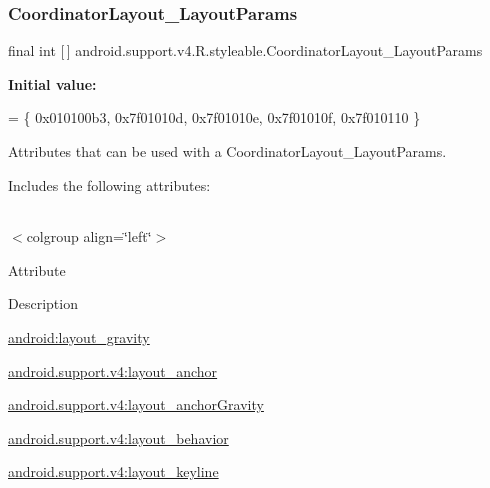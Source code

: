 \subsubsection{\texorpdfstring{Coordinator\+Layout\+\_\+\+Layout\+Params}{CoordinatorLayout\_LayoutParams}}
{\footnotesize\ttfamily final int \mbox{[}$\,$\mbox{]} android.\+support.\+v4.\+R.\+styleable.\+Coordinator\+Layout\+\_\+\+Layout\+Params\hspace{0.3cm}{\ttfamily [static]}}

{\bfseries Initial value\+:}
\begin{DoxyCode}
= \{
            0x010100b3, 0x7f01010d, 0x7f01010e, 0x7f01010f,
            0x7f010110
        \}
\end{DoxyCode}
Attributes that can be used with a Coordinator\+Layout\+\_\+\+Layout\+Params. 

Includes the following attributes\+:

\tabulinesep=1mm
\begin{longtabu} spread 0pt [c]{*{0}{|X[-1]}|}
\hline
\end{longtabu}
$<$colgroup align=\char`\"{}left\char`\"{}$>$ 

Attribute

Description 

{\ttfamily \hyperlink{classandroid_1_1support_1_1v4_1_1R_1_1styleable_a112dbd54fb1cb541e46c2eee8c3317be}{android\+:layout\+\_\+gravity}}

{\ttfamily \hyperlink{classandroid_1_1support_1_1v4_1_1R_1_1styleable_aa0e6a723ba8e1e1b09bbd5bbcd81a3f2}{android.\+support.\+v4\+:layout\+\_\+anchor}}

{\ttfamily \hyperlink{classandroid_1_1support_1_1v4_1_1R_1_1styleable_aebf704b49b05009455d48c43457e5b46}{android.\+support.\+v4\+:layout\+\_\+anchor\+Gravity}}

{\ttfamily \hyperlink{classandroid_1_1support_1_1v4_1_1R_1_1styleable_ab7698222e7d3cef07b5dfe63ccec5b53}{android.\+support.\+v4\+:layout\+\_\+behavior}}

{\ttfamily \hyperlink{classandroid_1_1support_1_1v4_1_1R_1_1styleable_a13e230146baaab7d1d0d6379b87fbef8}{android.\+support.\+v4\+:layout\+\_\+keyline}}

